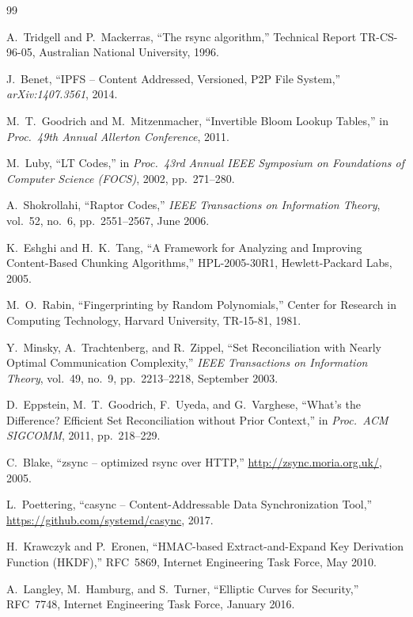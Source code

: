 \documentclass[11pt,twocolumn]{article}
\theoremstyle{definition}
\begin{document}

\begin{thebibliography}{99}

A.~Tridgell and P.~Mackerras,
``The rsync algorithm,''
Technical Report TR-CS-96-05, Australian National University, 1996.

J.~Benet,
``IPFS -- Content Addressed, Versioned, P2P File System,''
\textit{arXiv:1407.3561}, 2014.

M.~T.~Goodrich and M.~Mitzenmacher,
``Invertible Bloom Lookup Tables,''
in \textit{Proc.\ 49th Annual Allerton Conference}, 2011.

M.~Luby,
``LT Codes,''
in \textit{Proc.\ 43rd Annual IEEE Symposium on Foundations of Computer
Science (FOCS)}, 2002, pp.~271--280.

A.~Shokrollahi,
``Raptor Codes,''
\textit{IEEE Transactions on Information Theory}, vol.~52, no.~6,
pp.~2551--2567, June 2006.

K.~Eshghi and H.~K.~Tang,
``A Framework for Analyzing and Improving Content-Based Chunking
Algorithms,''
HPL-2005-30R1, Hewlett-Packard Labs, 2005.

M.~O.~Rabin,
``Fingerprinting by Random Polynomials,''
Center for Research in Computing Technology, Harvard University,
TR-15-81, 1981.

Y.~Minsky, A.~Trachtenberg, and R.~Zippel,
``Set Reconciliation with Nearly Optimal Communication Complexity,''
\textit{IEEE Transactions on Information Theory}, vol.~49, no.~9,
pp.~2213--2218, September 2003.

D.~Eppstein, M.~T.~Goodrich, F.~Uyeda, and G.~Varghese,
``What's the Difference? Efficient Set Reconciliation without Prior
Context,''
in \textit{Proc.\ ACM SIGCOMM}, 2011, pp.~218--229.

C.~Blake,
``zsync -- optimized rsync over HTTP,''
\url{http://zsync.moria.org.uk/}, 2005.

L.~Poettering,
``casync -- Content-Addressable Data Synchronization Tool,''
\url{https://github.com/systemd/casync}, 2017.

H.~Krawczyk and P.~Eronen,
``HMAC-based Extract-and-Expand Key Derivation Function (HKDF),''
RFC~5869, Internet Engineering Task Force, May 2010.

A.~Langley, M.~Hamburg, and S.~Turner,
``Elliptic Curves for Security,''
RFC~7748, Internet Engineering Task Force, January 2016.

\end{thebibliography}
\end{document}
